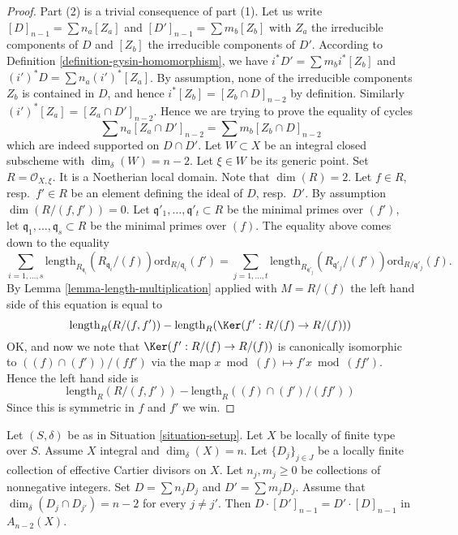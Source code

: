 \begin{proof}
Part (2) is a trivial consequence of part (1).
Let us write $[D]_{n - 1} = \sum n_a[Z_a]$ and
$[D']_{n - 1} = \sum m_b[Z_b]$ with $Z_a$ the irreducible
components of $D$ and $[Z_b]$ the irreducible
components of $D'$.
According to Definition \ref{definition-gysin-homomorphism},
we have $i^*D' = \sum m_b i^*[Z_b]$ and $(i')^*D = \sum n_a(i')^*[Z_a]$.
By assumption, none of the irreducible components $Z_b$
is contained in $D$, and hence $i^*[Z_b] = [Z_b\cap D]_{n - 2}$
by definition. Similarly $(i')^*[Z_a] = [Z_a \cap D']_{n - 2}$.
Hence we are trying to prove the equality of cycles
$$
\sum n_a[Z_a \cap D']_{n - 2} = \sum m_b[Z_b \cap D]_{n - 2}
$$
which are indeed supported on $D \cap D'$.
Let $W \subset X$ be an integral closed subscheme
with $\dim_\delta(W) = n - 2$. Let $\xi \in W$ be its generic point.
Set $R = \mathcal{O}_{X, \xi}$. It is a Noetherian local domain.
Note that $\dim(R) = 2$. Let $f \in R$, resp.\ $f' \in R$
be an element defining the ideal of $D$, resp.\ $D'$.
By assumption $\dim(R/(f, f')) = 0$. Let
$\mathfrak q'_1, \ldots, \mathfrak q'_t \subset R$ be the minimal
primes over $(f')$, let $\mathfrak q_1, \ldots, \mathfrak q_s \subset R$
be the minimal primes over $(f)$.
The equality above comes down to the equality
$$
\sum_{i = 1, \ldots, s}
\text{length}_{R_{\mathfrak q_i}}(R_{\mathfrak q_i}/(f))
\text{ord}_{R/\mathfrak q_i}(f')
=
\sum_{j = 1, \ldots, t}
\text{length}_{R_{\mathfrak q'_j}}(R_{\mathfrak q'_j}/(f'))
\text{ord}_{R/\mathfrak q'_j}(f).
$$
By Lemma \ref{lemma-length-multiplication} 
applied with $M = R/(f)$ the left hand side of
this equation is equal to
$$
\text{length}_R(R/(f, f'))
-
\text{length}_R(\Ker(f' : R/(f) \to R/(f)))
$$
OK, and now we note that
$\Ker(f' : R/(f) \to R/(f))$ is canonically isomorphic
to $((f) \cap (f'))/(ff')$ via the map $x \bmod (f) \mapsto
f'x \bmod (ff')$. Hence the left hand side is
$$
\text{length}_R(R/(f, f'))
-
\text{length}_R((f) \cap (f')/(ff'))
$$
Since this is symmetric in $f$ and $f'$ we win.
\end{proof}

\begin{lemma}
\label{lemma-commutativity-effective-Cartier-proper-intersection-infinite}
Let $(S, \delta)$ be as in Situation \ref{situation-setup}.
Let $X$ be locally of finite type over $S$.
Assume $X$ integral and $\dim_\delta(X) = n$.
Let $\{D_j\}_{j \in J}$ be a locally finite collection of
effective Cartier divisors on $X$. Let $n_j, m_j \geq 0$ be
collections of nonnegative integers. Set
$D = \sum n_j D_j$ and $D' = \sum m_j D_j$.
Assume that $\dim_\delta(D_j \cap D_{j'}) = n - 2$ for every
$j \not = j'$. Then $D \cdot [D']_{n - 1} = D' \cdot [D]_{n - 1}$ in
$A_{n - 2}(X)$.
\end{lemma}

